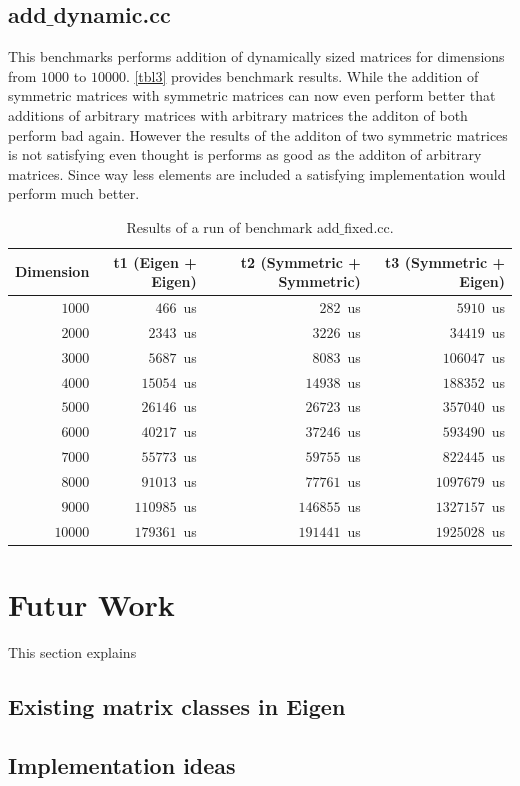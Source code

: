 \documentclass[a4wide]{scrartcl}
\begin{document}
\subsection{add$\_$dynamic.cc}
This benchmarks performs addition of dynamically sized matrices for dimensions from $1000$ to $10000$. \autoref{tbl3} provides benchmark results. While the addition of symmetric matrices with symmetric matrices can now even perform better that additions of arbitrary matrices with arbitrary matrices the additon of both perform bad again. However the results of the additon of two symmetric matrices is not satisfying even thought is performs as good as the additon of arbitrary matrices. Since way less elements are included a satisfying implementation would perform much better. 
\begin{table}
    \centering
\begin{tabular}{r|r|r|r}
    Dimension & t1 (Eigen + Eigen)  & t2 (Symmetric + Symmetric) & t3 (Symmetric + Eigen)  \\ \hline \hline
    $1000$  & $466$~us & $282$~us & $5910$~us\\
    $2000$  & $2343$~us & $3226$~us & $34419$~us\\
    $3000$  & $5687$~us & $8083$~us & $106047$~us\\
    $4000$  & $15054$~us & $14938$~us & $188352$~us\\
    $5000$  & $26146$~us & $26723$~us & $357040$~us\\
    $6000$  & $40217$~us & $37246$~us & $593490$~us\\
    $7000$  & $55773$~us & $59755$~us & $822445$~us \\
    $8000$  & $91013$~us & $77761$~us & $1097679$~us \\
    $9000$  & $110985$~us & $146855$~us & $1327157$~us\\
    $10000$ & $179361$~us & $191441$~us & $1925028$~us
    \end{tabular}
    \caption{Results of a run of benchmark add$\_$fixed.cc.}
    \label{tbl3}
\end{table}
\section{Futur Work}
This section explains 
\subsection{Existing matrix classes in Eigen}
\subsection{Implementation ideas}
\end{document}
